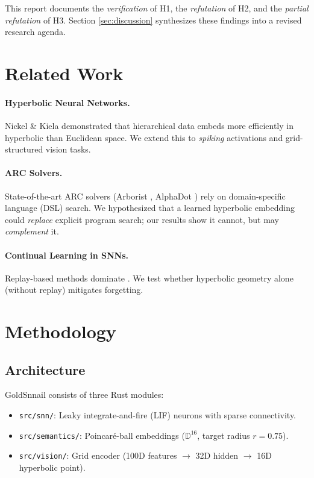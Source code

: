 \documentclass[11pt,a4paper]{article}
\begin{document}
This report documents the \emph{verification} of H1, the \emph{refutation} of H2, and the \emph{partial refutation} of H3. Section \ref{sec:discussion} synthesizes these findings into a revised research agenda.

\section{Related Work}
\label{sec:related}

\paragraph{Hyperbolic Neural Networks.} Nickel \& Kiela \cite{ nickel2017poincare} demonstrated that hierarchical data embeds more efficiently in hyperbolic than Euclidean space. We extend this to \emph{spiking} activations and grid-structured vision tasks.

\paragraph{ARC Solvers.} State-of-the-art ARC solvers (Arborist \cite{arborist}, AlphaDot \cite{alphadot}) rely on domain-specific language (DSL) search. We hypothesized that a learned hyperbolic embedding could \emph{replace} explicit program search; our results show it cannot, but may \emph{complement} it.

\paragraph{Continual Learning in SNNs.} Replay-based methods dominate \cite{replay_snn}. We test whether hyperbolic geometry alone (without replay) mitigates forgetting.

\section{Methodology}
\label{sec:method}

\subsection{Architecture}

GoldSnnail consists of three Rust modules:
\begin{itemize}
    \item \texttt{src/snn/}: Leaky integrate-and-fire (LIF) neurons with sparse connectivity.
    \item \texttt{src/semantics/}: Poincaré-ball embeddings ($\mathbb{D}^{16}$, target radius $r=0.75$).
    \item \texttt{src/vision/}: Grid encoder (100D features $\rightarrow$ 32D hidden $\rightarrow$ 16D hyperbolic point).
\end{itemize}
\end{document}
